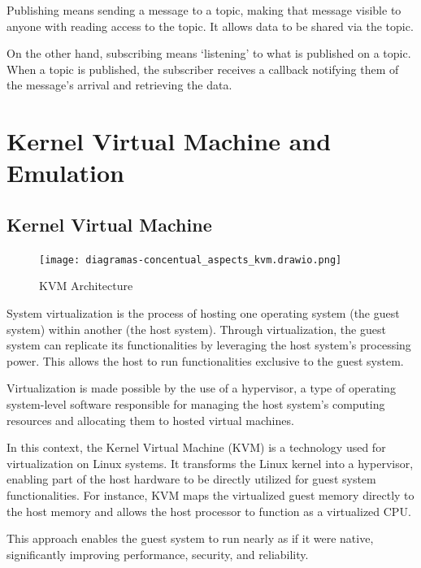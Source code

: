 \documentclass[../monografia.tex]{subfiles}
\begin{document}
Publishing means sending a message to a topic, making that message visible to anyone with reading access to the topic. It allows data to be shared via the topic.

On the other hand, subscribing means ‘listening’ to what is published on a topic. When a topic is published, the subscriber receives a callback notifying them of the message’s arrival and retrieving the data.

\section{Kernel Virtual Machine and Emulation}

\subsection{Kernel Virtual Machine}

\begin{figure}
    \centering
    \caption{KVM Architecture}
    \texttt{[image: diagramas-concentual\_aspects\_kvm.drawio.png]}
    \label{fig: KVM Architecture}
\end{figure}

System virtualization is the process of hosting one operating system (the guest system) within another (the host system). Through virtualization, the guest system can replicate its functionalities by leveraging the host system's processing power. This allows the host to run functionalities exclusive to the guest system.

Virtualization is made possible by the use of a hypervisor, a type of operating system-level software responsible for managing the host system's computing resources and allocating them to hosted virtual machines.

In this context, the Kernel Virtual Machine (KVM) \cite{Linux_KVM_23} is a technology used for virtualization on Linux systems. It transforms the Linux kernel into a hypervisor, enabling part of the host hardware to be directly utilized for guest system functionalities. For instance, KVM maps the virtualized guest memory directly to the host memory and allows the host processor to function as a virtualized CPU.

This approach enables the guest system to run nearly as if it were native, significantly improving performance, security, and reliability.
\end{document}
